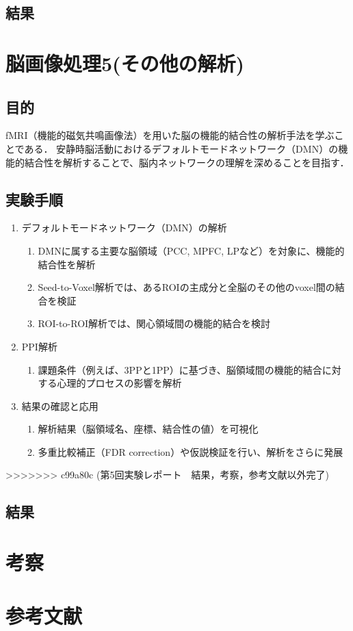 \documentclass{jlreq}
\begin{document}
\subsection{結果}

\section{脳画像処理5(その他の解析)}
\subsection{目的}
fMRI（機能的磁気共鳴画像法）を用いた脳の機能的結合性の解析手法を学ぶことである．
安静時脳活動におけるデフォルトモードネットワーク（DMN）の機能的結合性を解析することで、脳内ネットワークの理解を深めることを目指す．
\subsection{実験手順}
\begin{enumerate}
    \item デフォルトモードネットワーク（DMN）の解析
    \begin{enumerate}
        \item DMNに属する主要な脳領域（PCC, MPFC, LPなど）を対象に、機能的結合性を解析
        \item Seed-to-Voxel解析では、あるROIの主成分と全脳のその他のvoxel間の結合を検証
        \item ROI-to-ROI解析では、関心領域間の機能的結合を検討
    \end{enumerate}

    \item PPI解析 
    \begin{enumerate}
        \item 課題条件（例えば、3PPと1PP）に基づき、脳領域間の機能的結合に対する心理的プロセスの影響を解析
    \end{enumerate}

    \item 結果の確認と応用
    \begin{enumerate}
        \item 解析結果（脳領域名、座標、結合性の値）を可視化
        \item 多重比較補正（FDR correction）や仮説検証を行い、解析をさらに発展
    \end{enumerate}
\end{enumerate}
>>>>>>> c99a80c (第5回実験レポート　結果，考察，参考文献以外完了)
\subsection{結果}



\section{考察}



\section*{参考文献}
\end{document}
